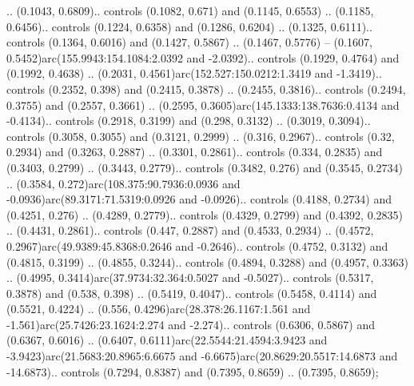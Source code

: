 .. (0.1043, 0.6809).. controls (0.1082, 0.671) and (0.1145, 0.6553) .. (0.1185, 0.6456).. controls (0.1224, 0.6358) and (0.1286, 0.6204) .. (0.1325, 0.6111).. controls (0.1364, 0.6016) and (0.1427, 0.5867) .. (0.1467, 0.5776) -- (0.1607, 0.5452)arc(155.9943:154.1084:2.0392 and -2.0392).. controls (0.1929, 0.4764) and (0.1992, 0.4638) .. (0.2031, 0.4561)arc(152.527:150.0212:1.3419 and -1.3419).. controls (0.2352, 0.398) and (0.2415, 0.3878) .. (0.2455, 0.3816).. controls (0.2494, 0.3755) and (0.2557, 0.3661) .. (0.2595, 0.3605)arc(145.1333:138.7636:0.4134 and -0.4134).. controls (0.2918, 0.3199) and (0.298, 0.3132) .. (0.3019, 0.3094).. controls (0.3058, 0.3055) and (0.3121, 0.2999) .. (0.316, 0.2967).. controls (0.32, 0.2934) and (0.3263, 0.2887) .. (0.3301, 0.2861).. controls (0.334, 0.2835) and (0.3403, 0.2799) .. (0.3443, 0.2779).. controls (0.3482, 0.276) and (0.3545, 0.2734) .. (0.3584, 0.272)arc(108.375:90.7936:0.0936 and -0.0936)arc(89.3171:71.5319:0.0926 and -0.0926).. controls (0.4188, 0.2734) and (0.4251, 0.276) .. (0.4289, 0.2779).. controls (0.4329, 0.2799) and (0.4392, 0.2835) .. (0.4431, 0.2861).. controls (0.447, 0.2887) and (0.4533, 0.2934) .. (0.4572, 0.2967)arc(49.9389:45.8368:0.2646 and -0.2646).. controls (0.4752, 0.3132) and (0.4815, 0.3199) .. (0.4855, 0.3244).. controls (0.4894, 0.3288) and (0.4957, 0.3363) .. (0.4995, 0.3414)arc(37.9734:32.364:0.5027 and -0.5027).. controls (0.5317, 0.3878) and (0.538, 0.398) .. (0.5419, 0.4047).. controls (0.5458, 0.4114) and (0.5521, 0.4224) .. (0.556, 0.4296)arc(28.378:26.1167:1.561 and -1.561)arc(25.7426:23.1624:2.274 and -2.274).. controls (0.6306, 0.5867) and (0.6367, 0.6016) .. (0.6407, 0.6111)arc(22.5544:21.4594:3.9423 and -3.9423)arc(21.5683:20.8965:6.6675 and -6.6675)arc(20.8629:20.5517:14.6873 and -14.6873).. controls (0.7294, 0.8387) and (0.7395, 0.8659) .. (0.7395, 0.8659);



